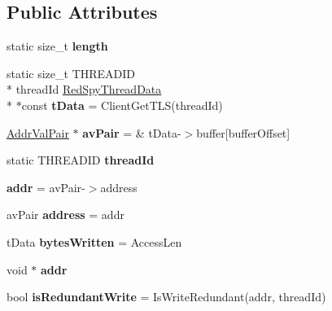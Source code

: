 \subsection*{Public Attributes}
\begin{DoxyCompactItemize}
\item 
\hypertarget{structRedSpyAnalysis_a190133dbc7b3810998e0154a565f8a55}{static size\-\_\-t {\bfseries length}}\label{structRedSpyAnalysis_a190133dbc7b3810998e0154a565f8a55}

\item 
\hypertarget{structRedSpyAnalysis_a820f54acc04dffb7353b3e7b3ee80863}{static size\-\_\-t T\-H\-R\-E\-A\-D\-I\-D \\*
thread\-Id \hyperlink{structRedSpyThreadData}{Red\-Spy\-Thread\-Data} \\*
$\ast$const {\bfseries t\-Data} = Client\-Get\-T\-L\-S(thread\-Id)}\label{structRedSpyAnalysis_a820f54acc04dffb7353b3e7b3ee80863}

\item 
\hypertarget{structRedSpyAnalysis_a7a84ab12a4ab481daa9562ac4a60b458}{\hyperlink{structAddrValPair}{Addr\-Val\-Pair} $\ast$ {\bfseries av\-Pair} = \& t\-Data-\/$>$buffer\mbox{[}buffer\-Offset\mbox{]}}\label{structRedSpyAnalysis_a7a84ab12a4ab481daa9562ac4a60b458}

\item 
static T\-H\-R\-E\-A\-D\-I\-D {\bfseries thread\-Id}
\item 
\hypertarget{structRedSpyAnalysis_a73fcb8cf1549a897093f29ea15f896a7}{{\bfseries addr} = av\-Pair-\/$>$address}\label{structRedSpyAnalysis_a73fcb8cf1549a897093f29ea15f896a7}

\item 
\hypertarget{structRedSpyAnalysis_af045e3482b86c80e9a2a174d86edbdf5}{av\-Pair {\bfseries address} = addr}\label{structRedSpyAnalysis_af045e3482b86c80e9a2a174d86edbdf5}

\item 
\hypertarget{structRedSpyAnalysis_ac128481f074db36a23045d05c5265bf2}{t\-Data {\bfseries bytes\-Written} = Access\-Len}\label{structRedSpyAnalysis_ac128481f074db36a23045d05c5265bf2}

\item 
\hypertarget{structRedSpyAnalysis_a3429dec50b3c72e6db1aa4b513ed998a}{void $\ast$ {\bfseries addr}}\label{structRedSpyAnalysis_a3429dec50b3c72e6db1aa4b513ed998a}

\item 
\hypertarget{structRedSpyAnalysis_aeddf16b4eb3d4fd239f5d377b11e2bc7}{bool {\bfseries is\-Redundant\-Write} = Is\-Write\-Redundant(addr, thread\-Id)}\label{structRedSpyAnalysis_aeddf16b4eb3d4fd239f5d377b11e2bc7}


\end{DoxyCompactItemize}
